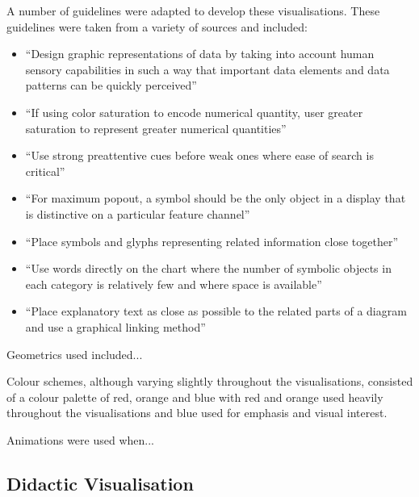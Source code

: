 A number of guidelines were adapted to develop these visualisations. These guidelines were taken from a variety of sources and included:
\begin{itemize}
\item ``Design graphic representations of data by taking into account human sensory capabilities in such a way that important data elements and data patterns can be quickly perceived''~\cite[p.~14]{Ware2013a} 
\item ``If using color saturation to encode numerical quantity, user greater saturation to represent greater numerical quantities''~\cite[p.~117]{Ware2013a} 
\item ``Use strong preattentive cues before weak ones where ease of search is critical''~\cite[p.~156]{Ware2013a} 
\item ``For maximum popout, a symbol should be the only object in a display that is distinctive on a particular feature channel''~\cite[p.~157]{Ware2013a} 
\item ``Place symbols and glyphs representing related information close together''~\cite[p.~181]{Ware2013a} 
\item ``Use words directly on the chart where the number of symbolic objects in each category is relatively few and where space is available''~\cite[p.~321]{Ware2013a} 
\item ``Place explanatory text as close as possible to the related parts of a diagram and use a graphical linking method''~\cite[p.~333]{Ware2013a} 
\end{itemize}

Geometrics used included... \more

Colour schemes, although varying slightly throughout the visualisations, consisted of a colour palette of red, orange and blue with red and orange used heavily throughout the visualisations and blue used for emphasis and visual interest.

Animations were used when... \more

\subsection{Didactic Visualisation}
\label{sec:didactic-visualisation}



